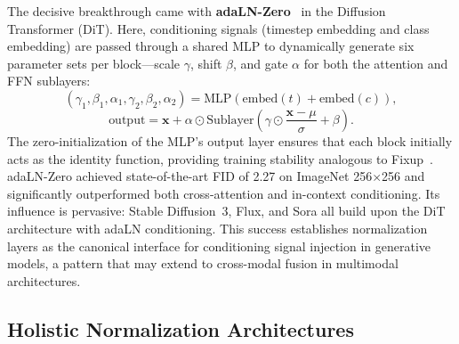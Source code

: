 The decisive breakthrough came with \textbf{adaLN-Zero}~\cite{peebles2023scalable} in the Diffusion Transformer (DiT).
Here, conditioning signals (timestep embedding and class embedding) are passed through a shared MLP to dynamically generate six parameter sets per block---scale $\gamma$, shift $\beta$, and gate $\alpha$ for both the attention and FFN sublayers:
\begin{equation}
    (\gamma_1, \beta_1, \alpha_1, \gamma_2, \beta_2, \alpha_2) = \text{MLP}\!\left(\text{embed}(t) + \text{embed}(c)\right),
\end{equation}
\begin{equation}
    \text{output} = \mathbf{x} + \alpha \odot \text{Sublayer}\!\left(\gamma \odot \frac{\mathbf{x} - \mu}{\sigma} + \beta\right).
\end{equation}
The zero-initialization of the MLP's output layer ensures that each block initially acts as the identity function, providing training stability analogous to Fixup~\cite{zhang2019fixup}.
adaLN-Zero achieved state-of-the-art FID of 2.27 on ImageNet 256$\times$256 and significantly outperformed both cross-attention and in-context conditioning.
Its influence is pervasive: Stable Diffusion~3, Flux, and Sora all build upon the DiT architecture with adaLN conditioning.
This success establishes normalization layers as the canonical interface for conditioning signal injection in generative models, a pattern that may extend to cross-modal fusion in multimodal architectures.

\subsection{Holistic Normalization Architectures}

